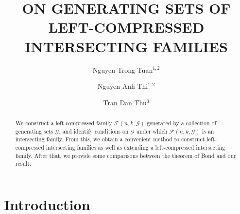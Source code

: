 \documentclass[reqno,english]{amsart}
\title{ ON GENERATING SETS OF LEFT-COMPRESSED INTERSECTING FAMILIES}
\author{Nguyen Trong Tuan$^{1,2}$}
\author{Nguyen Anh Thi$^{1,2}$}
\author{ Tran Dan Thu$^3$}
\theoremstyle{plain}
\theoremstyle{remark}
\newcommand{\0}[0]{\emptyset}
\renewcommand{\1}[0]{\textbf{1}}
\theoremstyle{plain}
\theoremstyle{remark}
\renewcommand{\1}[0]{\textbf{1}}
\begin{document}
%
\begin{abstract} We construct a left-compressed family $\mathcal{F}(n,k,\mathcal{G})$ generated by a collection of generating sets $\mathcal{G}$, and identify conditions on $\mathcal{G}$ under which $\mathcal{F}(n,k,\mathcal{G})$ is an intersecting family. From this, we obtain a convenient method to construct left-compressed intersecting families as well as extending a left-compressed intersecting family. After that, we provide some comparisons between the theorem of Bond and our result.
\end{abstract}
\maketitle

\section{Introduction}
\end{document}
